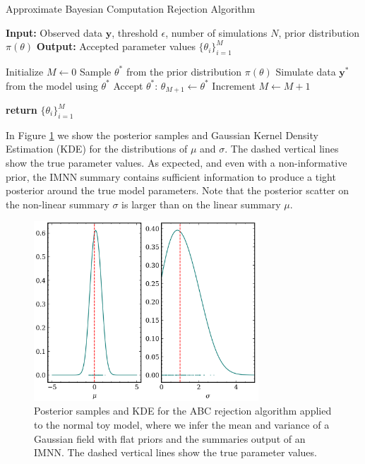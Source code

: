 \begin{algorithm}
    \caption{Approximate Bayesian Computation Rejection Algorithm}\label{alg:ABC}
    \begin{algorithmic}[1]
    \State \textbf{Input:} Observed data $\mathbf{y}$, threshold $\epsilon$, number of simulations $N$, prior distribution $\pi(\theta)$
    \State \textbf{Output:} Accepted parameter values $\{\theta_i\}_{i=1}^M$
    
    \State Initialize $M \gets 0$
        \State Sample $\theta^*$ from the prior distribution $\pi(\theta)$
        \State Simulate data $\mathbf{y}^*$ from the model using $\theta^*$
            \State Accept $\theta^*$: $\theta_{M+1} \gets \theta^*$
            \State Increment $M \gets M + 1$
        \EndIf
    \EndFor
    
    \State \textbf{return} $\{\theta_i\}_{i=1}^M$
    \end{algorithmic}
    \end{algorithm}
In Figure \ref{fig:IMNN normal posterior} we show the posterior samples and Gaussian Kernel Density Estimation (KDE) for the distributions of $\mu$ and $\sigma$. The dashed vertical lines show the true parameter values. As expected, and even with a non-informative prior, the IMNN summary contains sufficient information to produce a tight posterior around the true model parameters. Note that the posterior scatter on the non-linear summary $\sigma$ is larger than on the linear summary $\mu$.

\begin{figure}
    \centering
    \includegraphics[width=0.75\textwidth]{img/ML/ABC_posteriors_normal.png}
    \caption{Posterior samples and KDE for the ABC rejection algorithm applied to the normal toy model, where we infer the mean and variance of a Gaussian field with flat priors and the summaries output of an IMNN. The dashed vertical lines show the true parameter values.}
    \label{fig:IMNN normal posterior}
\end{figure}







